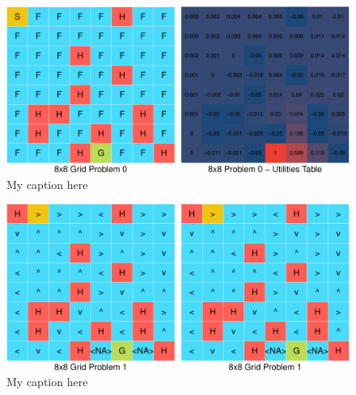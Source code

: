 \documentclass[11pt,]{article}
\begin{document}
\begin{figure}[h]

{\centering \includegraphics[width=0.85\linewidth]{project_files/figure-latex/lakes3-1} 

}

\caption{\label{fig:appendixa} My caption here}\label{fig:lakes31}
\end{figure}\begin{figure}[h]

{\centering \includegraphics[width=0.85\linewidth]{project_files/figure-latex/lakes3-2} 

}

\caption{\label{fig:appendixa} My caption here}\label{fig:lakes32}
\end{figure}
\end{document}
